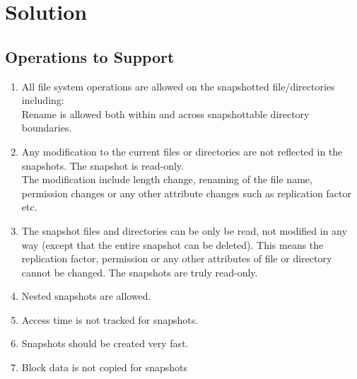 
%
%
%

\chapter{Solution}
\label{ch:solution}

\section{Operations to Support}

\begin{enumerate}
\item All file system operations are allowed on the snapshotted file/directories including:\\
\hspace{5em} Rename is allowed both within and across snapshottable directory boundaries.

\item Any modification to the current files or directories are not reflected in the snapshots. The
snapshot is read-only.\\
\hspace{5 em} The modification include length change, renaming of the file name, permission changes or any other attribute changes such as replication factor etc.

\item The snapshot files and directories can be only be read, not modified in any way (except that the
entire snapshot can be deleted). This means the replication factor, permission or any other
attributes of file or directory cannot be changed. The snapshots are truly read-only.

\item Nested snapshots are allowed.

\item Access time is not tracked for snapshots.

\item Snapshots should be created very fast.

\item Block data is not copied for snapshots

\end{enumerate}


